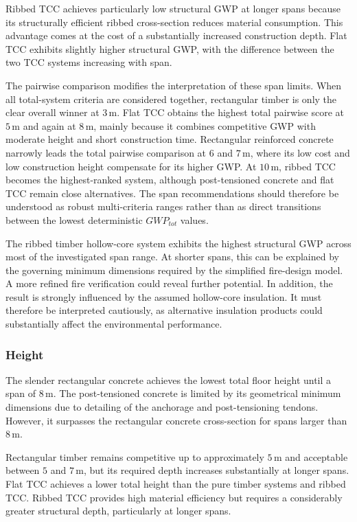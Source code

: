 Ribbed TCC achieves particularly low structural GWP at longer spans because its structurally efficient ribbed cross-section reduces material consumption. This advantage comes at the cost of a substantially increased construction depth. Flat TCC exhibits slightly higher structural GWP, with the difference between the two TCC systems increasing with span.

The pairwise comparison modifies the interpretation of these span limits. When all total-system criteria are considered together, rectangular timber is only the clear overall winner at \(3\,\mathrm{m}\). Flat TCC obtains the highest total pairwise score at \(5\,\mathrm{m}\) and again at \(8\,\mathrm{m}\), mainly because it combines competitive GWP with moderate height and short construction time. Rectangular reinforced concrete narrowly leads the total pairwise comparison at \(6\) and \(7\,\mathrm{m}\), where its low cost and low construction height compensate for its higher GWP. At \(10\,\mathrm{m}\), ribbed TCC becomes the highest-ranked system, although post-tensioned concrete and flat TCC remain close alternatives. The span recommendations should therefore be understood as robust multi-criteria ranges rather than as direct transitions between the lowest deterministic \(GWP_{tot}\) values.

The ribbed timber hollow-core system exhibits the highest structural GWP across most of the investigated span range. At shorter spans, this can be explained by the governing minimum dimensions required by the simplified fire-design model. A more refined fire verification could reveal further potential. In addition, the result is strongly influenced by the assumed hollow-core insulation. It must therefore be interpreted cautiously, as alternative insulation products could substantially affect the environmental performance.

\subsubsection{Height}
The slender rectangular concrete achieves the lowest total floor height until a span of \(8\,\mathrm{m}\). The post-tensioned concrete is limited by its geometrical minimum dimensions due to detailing of the anchorage and post-tensioning tendons. However, it surpasses the rectangular concrete cross-section for spans larger than \(8\,\mathrm{m}\).

Rectangular timber remains competitive up to approximately \(5\,\mathrm{m}\) and acceptable between \(5\) and \(7\,\mathrm{m}\), but its required depth increases substantially at longer spans. Flat TCC achieves a lower total height than the pure timber systems and ribbed TCC. Ribbed TCC provides high material efficiency but requires a considerably greater structural depth, particularly at longer spans.

